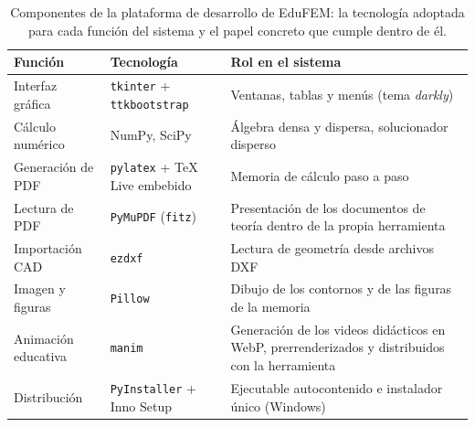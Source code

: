 \begin{table}[H]
\centering
\caption[Componentes de la plataforma de desarrollo de EduFEM.]{Componentes de la plataforma de desarrollo de EduFEM: la tecnología adoptada para cada función del sistema y el papel concreto que cumple dentro de él.}
\label{tab:stack}
\setlength{\tabcolsep}{4pt}
\begin{tabular}{@{}l >{\raggedright\arraybackslash}p{4.0cm} >{\raggedright\arraybackslash}p{6.9cm}@{}}
\toprule
\textbf{Función} & \textbf{Tecnología} & \textbf{Rol en el sistema} \\
\midrule
Interfaz gráfica      & \texttt{tkinter} + \texttt{ttkbootstrap} & Ventanas, tablas y menús (tema \emph{darkly}) \\
Cálculo numérico      & NumPy, SciPy                              & Álgebra densa y dispersa, solucionador disperso \\
Generación de PDF     & \texttt{pylatex} + \TeX{} Live embebido    & Memoria de cálculo paso a paso \\
Lectura de PDF        & \texttt{PyMuPDF} (\texttt{fitz})          & Presentación de los documentos de teoría dentro de la propia herramienta \\
Importación CAD       & \texttt{ezdxf}                            & Lectura de geometría desde archivos DXF \\
Imagen y figuras      & \texttt{Pillow}                           & Dibujo de los contornos y de las figuras de la memoria \\
Animación educativa   & \texttt{manim}                            & Generación de los videos didácticos en WebP, prerrenderizados y distribuidos con la herramienta \\
Distribución          & \texttt{PyInstaller} + Inno Setup         & Ejecutable autocontenido e instalador único (Windows) \\
\bottomrule
\end{tabular}
{\singlespacing{}}
\end{table}


